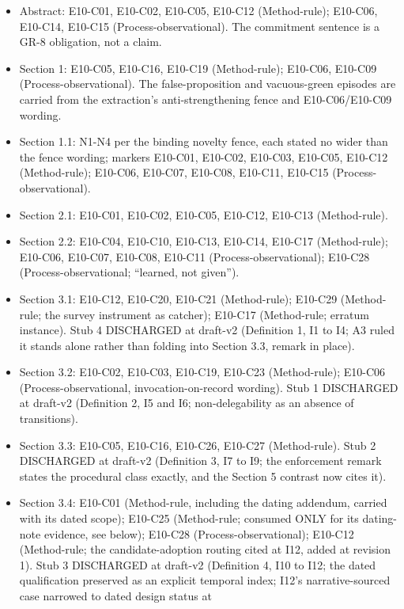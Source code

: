 \documentclass[
  11pt,
]{article}
\providecommand{\tightlist}{%
  \setlength{\itemsep}{0pt}\setlength{\parskip}{0pt}}
\begin{document}
\begin{itemize}
\tightlist
\item
  Abstract: E10-C01, E10-C02, E10-C05, E10-C12 (Method-rule); E10-C06,
  E10-C14, E10-C15 (Process-observational). The commitment sentence is a
  GR-8 obligation, not a claim.
\item
  Section 1: E10-C05, E10-C16, E10-C19 (Method-rule); E10-C06, E10-C09
  (Process-observational). The false-proposition and vacuous-green
  episodes are carried from the extraction's anti-strengthening fence
  and E10-C06/E10-C09 wording.
\item
  Section 1.1: N1-N4 per the binding novelty fence, each stated no wider
  than the fence wording; markers E10-C01, E10-C02, E10-C03, E10-C05,
  E10-C12 (Method-rule); E10-C06, E10-C07, E10-C08, E10-C11, E10-C15
  (Process-observational).
\item
  Section 2.1: E10-C01, E10-C02, E10-C05, E10-C12, E10-C13
  (Method-rule).
\item
  Section 2.2: E10-C04, E10-C10, E10-C13, E10-C14, E10-C17
  (Method-rule); E10-C06, E10-C07, E10-C08, E10-C11
  (Process-observational); E10-C28 (Process-observational; ``learned,
  not given'').
\item
  Section 3.1: E10-C12, E10-C20, E10-C21 (Method-rule); E10-C29
  (Method-rule; the survey instrument as catcher); E10-C17 (Method-rule;
  erratum instance). Stub 4 DISCHARGED at draft-v2 (Definition 1, I1 to
  I4; A3 ruled it stands alone rather than folding into Section 3.3,
  remark in place).
\item
  Section 3.2: E10-C02, E10-C03, E10-C19, E10-C23 (Method-rule); E10-C06
  (Process-observational, invocation-on-record wording). Stub 1
  DISCHARGED at draft-v2 (Definition 2, I5 and I6; non-delegability as
  an absence of transitions).
\item
  Section 3.3: E10-C05, E10-C16, E10-C26, E10-C27 (Method-rule). Stub 2
  DISCHARGED at draft-v2 (Definition 3, I7 to I9; the enforcement remark
  states the procedural class exactly, and the Section 5 contrast now
  cites it).
\item
  Section 3.4: E10-C01 (Method-rule, including the dating addendum,
  carried with its dated scope); E10-C25 (Method-rule; consumed ONLY for
  its dating-note evidence, see below); E10-C28 (Process-observational);
  E10-C12 (Method-rule; the candidate-adoption routing cited at I12,
  added at revision 1). Stub 3 DISCHARGED at draft-v2 (Definition 4, I10
  to I12; the dated qualification preserved as an explicit temporal
  index; I12's narrative-sourced case narrowed to dated design status at

\end{itemize}
\end{document}
